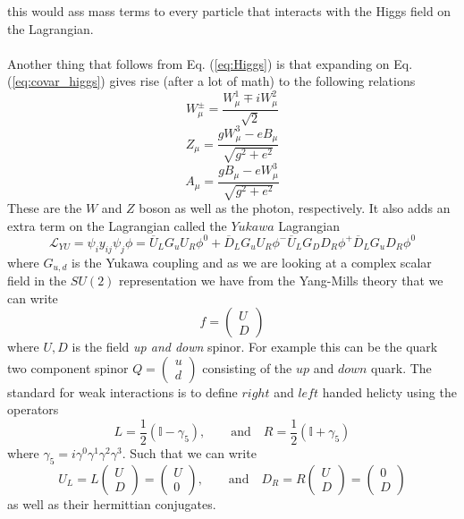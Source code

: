 \documentclass[12pt, a4paper]{book}
\begin{document}
this would ass mass terms to every particle that interacts with the Higgs field on the Lagrangian.\\
\\Another thing that follows from Eq. (\ref{eq:Higgs}) is that expanding on Eq. (\ref{eq:covar_higgs}) gives rise (after a lot of math) to the following relations
\begin{equation}\label{eq:W_boson}
    W_\mu^\pm = \frac{W_\mu^1 \mp iW_\mu^2}{\sqrt{2}}
\end{equation}
\begin{equation}\label{eq:Z_boson}
    Z_\mu = \frac{gW_\mu^3 - eB_\mu}{\sqrt{g^2+e^2}}
\end{equation}
\begin{equation}\label{eq:photon}
    A_\mu = \frac{gB_\mu - eW_\mu^3}{\sqrt{g^2+e^2}}
\end{equation}
These are the $W$ and $Z$ boson as well as the photon, respectively. It also adds an extra term on the Lagrangian called the $Yukawa$ Lagrangian
$$
\mathcal{L}_{YU} = \psi_i y_{ij}\psi_j\phi = \overline{U}_L G_u U_R \phi^0 + \overline{D}_L G_u U_R \phi^- \overline{U}_L G_D D_R \phi^+ \overline{D}_L G_u D_R \phi^0
$$
where $G_{u,d}$ is the Yukawa coupling and as we are looking at a complex scalar field in the $SU(2)$ representation we have from the Yang-Mills theory that we can write
$$
f=\begin{pmatrix}
    U\\D
\end{pmatrix}
$$
where $U,D$ is the field \textit{up and down} spinor. For example this can be the quark two component spinor $Q = \begin{pmatrix}
    u\\ d
\end{pmatrix}$ consisting of the $up$ and $down$ quark. The standard for weak interactions is to define $right$ and $left$ handed helicty using the operators 
$$
L = \frac{1}{2}(\mathbb{I} - \gamma_5),\qquad\text{and}\quad R = \frac{1}{2}(\mathbb{I} + \gamma_5)
$$
where $\gamma_{5}=i\gamma^0\gamma^1\gamma^2\gamma^3$. Such that we can write 
$$
U_L = L\begin{pmatrix}
    U\\D
\end{pmatrix} = \begin{pmatrix}
    U\\0
\end{pmatrix},\qquad\text{and}\quad D_R = R\begin{pmatrix}
    U\\D
\end{pmatrix} = \begin{pmatrix}
    0\\D
\end{pmatrix}
$$
as well as their hermittian conjugates. 
\end{document}
